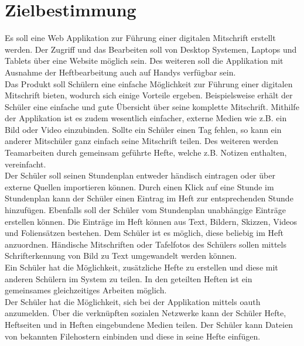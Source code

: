 \documentclass[12pt,a4paper,oneside,ngerman]{scrartcl}
\begin{document}
\justify
\section{Zielbestimmung}
Es soll eine Web Applikation zur Führung einer digitalen Mitschrift erstellt werden. Der Zugriff und das Bearbeiten soll von Desktop Systemen, Laptops und Tablets über eine Website möglich sein. Des weiteren soll die Applikation mit Ausnahme der Heftbearbeitung auch auf Handys verfügbar sein. \\

Das Produkt soll Schülern eine einfache Möglichkeit zur Führung einer digitalen Mitschrift bieten, wodurch sich einige Vorteile ergeben. Beispielsweise erhält der Schüler eine einfache und gute Übersicht über seine komplette Mitschrift. Mithilfe der Applikation ist es zudem wesentlich einfacher, externe Medien wie z.B. ein Bild oder Video einzubinden. Sollte ein Schüler einen Tag fehlen, so kann ein anderer Mitschüler ganz einfach seine Mitschrift teilen. Des weiteren werden Teamarbeiten durch gemeinsam geführte Hefte, welche z.B. Notizen enthalten, vereinfacht.\\

Der Schüler soll seinen Stundenplan entweder händisch eintragen oder über externe Quellen importieren können. Durch einen Klick auf eine Stunde im Stundenplan kann der Schüler einen Eintrag im Heft zur entsprechenden Stunde hinzufügen. Ebenfalls soll der Schüler vom Stundenplan unabhängige Einträge erstellen können. Die Einträge im Heft können aus Text, Bildern, Skizzen, Videos und Foliensätzen bestehen. Dem Schüler ist es möglich, diese beliebig im Heft anzuordnen. Händische Mitschriften oder Tafelfotos des Schülers sollen mittels Schrifterkennung von Bild zu Text umgewandelt werden können.\\

Ein Schüler hat die Möglichkeit, zusätzliche Hefte zu erstellen und diese mit anderen Schülern im System zu teilen. In den
geteilten Heften ist ein gemeinsames gleichzeitiges Arbeiten möglich.\\

Der Schüler hat die Möglichkeit, sich bei der Applikation mittels \gls{oauth} anzumelden. Über die verknüpften sozialen Netzwerke
kann der Schüler Hefte, Heftseiten und in Heften eingebundene Medien teilen. Der Schüler kann Dateien von bekannten Filehostern einbinden und diese in seine Hefte einfügen.\\
\end{document}
